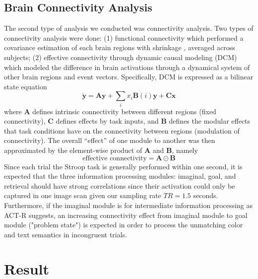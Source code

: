 \documentclass[10pt,letterpaper]{article}
\newcommand{\vct}[1]{\boldsymbol{#1}} %
\newcommand{\mat}[1]{\boldsymbol{#1}} %
\begin{document}
\subsection{Brain Connectivity Analysis}
The second type of analysis we conducted was connectivity analysis. Two types of connectivity analysis were done: (1) functional connectivity \cite{Rogers2007} which performed a covariance estimation of each brain regions with shrinkage \cite{Ledoit2004}, averaged across subjects; (2) effective connectivity through dynamic causal modeling (DCM) \cite{Friston2003, Stocco2018} which modeled the difference in brain activations through a dynamical system of other brain regions and event vectors. Specifically, DCM is expressed as a bilinear state equation
\[\dot{\vct{y}} = \mat{A}\vct{y} + \sum_{i}x_i\mat{B}(i)\vct{y} + \mat{C}\vct{x}\]
where $\mat{A}$ defines intrinsic connectivity between different regions (fixed connectivity), $\mat{C}$ defines effects by task inputs, and $\mat{B}$ defines the modular effects that task conditions have on the connectivity between regions (modulation of connectivity). The overall ``effect'' of one module
to another was then approximated by the element-wise product of $\mat{A}$ and $\mat{B}$, namely
\[\text{effective connectivity} = \mat{A} \odot \mat{B}\]
Since each trial the Stroop task is generally performed within one second, it is expected that the three information processing modules: imaginal, goal, and retrieval should have strong correlations since their activation could only be captured in one image scan given our sampling rate $TR = 1.5$ seconds. Furthermore, if the imaginal module is for intermediate information processing as ACT-R suggests, an increasing connectivity effect from imaginal module to goal module ("problem state") is expected in order to process the unmatching color and text semantics in incongruent trials.

\section{Result}
\end{document}

